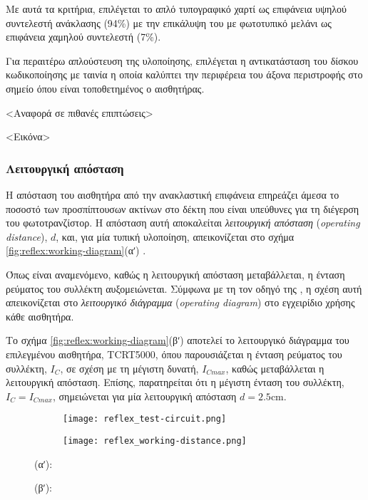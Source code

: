 Με αυτά τα κριτήρια, επιλέγεται το απλό τυπογραφικό χαρτί ως επιφάνεια υψηλού
συντελεστή ανάκλασης (94\%) με την επικάλυψη του με φωτοτυπικό μελάνι ως
επιφάνεια χαμηλού συντελεστή (7\%).

Για περαιτέρω απλούστευση της υλοποίησης, επιλέγεται η αντικατάσταση του δίσκου
κωδικοποίησης με ταινία η οποία καλύπτει την περιφέρεια του άξονα περιστροφής
στο σημείο όπου είναι τοποθετημένος ο αισθητήρας.

<Αναφορά σε πιθανές επιπτώσεις>

<Εικόνα>

\subsubsection{Λειτουργική απόσταση}

Η απόσταση του αισθητήρα από την ανακλαστική επιφάνεια επηρεάζει άμεσα το
ποσοστό των προσπίπτουσων ακτίνων στο δέκτη που είναι υπεύθυνες για τη διέγερση
του φωτοτρανζίστορ. Η απόσταση αυτή αποκαλείται \emph{λειτουργική απόσταση}
 (\emph{operating distance}), $d$, και, για μία
τυπική υλοποίηση, απεικονίζεται στο σχήμα \ref{fig:reflex:working-diagram}(αʹ)
\parencite{vishay02}.

Όπως είναι αναμενόμενο, καθώς η λειτουργική απόσταση μεταβάλλεται, η ένταση
ρεύματος του συλλέκτη αυξομειώνεται. Σύμφωνα με τη τον οδηγό της
\textcite{vishay06}, η σχέση αυτή απεικονίζεται στο \emph{λειτουργικό διάγραμμα}
 (\emph{operating diagram}) στο εγχειρίδιο χρήσης
κάθε αισθητήρα.

Το σχήμα \ref{fig:reflex:working-diagram}(βʹ) αποτελεί το λειτουργικό διάγραμμα
του επιλεγμένου αισθητήρα, TCRT5000, όπου παρουσιάζεται η ένταση ρεύματος του
συλλέκτη, $I_{C}$, σε σχέση με τη μέγιστη δυνατή, $I_{Cmax}$, καθώς μεταβάλλεται
η λειτουργική απόσταση.
Επίσης, παρατηρείται ότι η μέγιστη ένταση του συλλέκτη, $I_{C} = I_{Cmax}$,
σημειώνεται για μία λειτουργική απόσταση $d = 2.5$cm.

\begin{figure}
    \caption{Λειτουργική απόσταση και λειτουργικό διάγραμμα.
        \label{fig:reflex:working-diagram}}
    \begin{center}
        \begin{subfigure}[b]{0.45\textwidth}
            \texttt{[image: reflex\_test-circuit.png]}
            \caption{}
        \end{subfigure}
        \begin{subfigure}[b]{0.45\textwidth}
            \texttt{[image: reflex\_working-distance.png]}
            \caption{}
        \end{subfigure}
    \end{center}

    (αʹ): 

    (βʹ): 
\end{figure}

